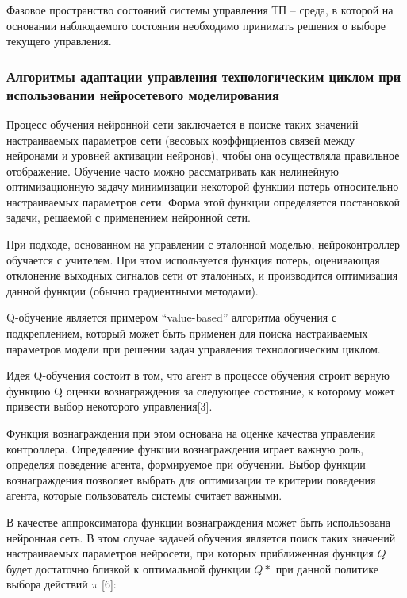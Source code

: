 Фазовое пространство состояний системы управления ТП – среда, в которой на основании наблюдаемого состояния необходимо принимать решения о выборе текущего управления.






\subsubsection{Алгоритмы адаптации управления технологическим циклом при использовании нейросетевого моделирования}

Процесс обучения нейронной сети заключается в поиске таких значений настраиваемых параметров сети (весовых коэффициентов связей между нейронами и уровней активации нейронов), чтобы она осуществляла правильное отображение. Обучение часто можно рассматривать как нелинейную оптимизационную задачу минимизации некоторой функции потерь относительно настраиваемых параметров сети. Форма этой функции определяется постановкой задачи, решаемой с применением нейронной сети.

При подходе, основанном на управлении с эталонной моделью, нейроконтроллер обучается с учителем. При этом используется функция потерь, оценивающая отклонение выходных сигналов сети от эталонных, и производится оптимизация данной функции (обычно градиентными методами).


Q-обучение  является примером ``value-based'' алгоритма обучения с подкреплением, который может быть применен для поиска настраиваемых параметров модели при решении задач управления технологическим циклом.


Идея Q-обучения состоит в том, что агент в процессе обучения строит верную функцию Q оценки вознаграждения за следующее состояние, к которому может привести выбор некоторого управления[3].


Функция вознаграждения при этом основана на оценке качества управления контроллера. Определение функции вознаграждения играет важную роль, определяя поведение агента, формируемое при обучении. Выбор функции вознаграждения позволяет выбрать для оптимизации те критерии поведения агента, которые пользователь системы считает важными.


В качестве аппроксиматора функции вознаграждения может быть использована нейронная сеть. В этом случае задачей обучения является поиск таких значений настраиваемых параметров нейросети, при которых приближенная функция $Q$ будет достаточно близкой к оптимальной функции $Q*$ при данной политике выбора действий $\pi$ [6]:



